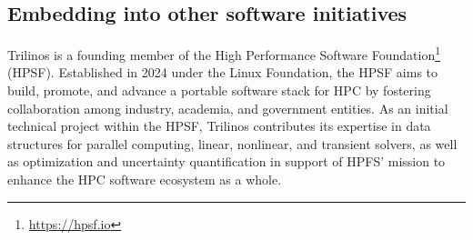 \subsection{Embedding into other software initiatives}

Trilinos is a founding member of the High Performance Software Foundation\footnote{\url{https://hpsf.io}} (HPSF).
Established in 2024 under the Linux Foundation,
the HPSF aims to build, promote, and advance a portable software stack for HPC by fostering collaboration among industry, academia, and government entities.
As an initial technical project within the HPSF, Trilinos contributes its expertise in data structures for parallel computing, linear, nonlinear, and transient solvers,
as well as optimization and uncertainty quantification in support of HPFS' mission to enhance the HPC software ecosystem as a whole.
